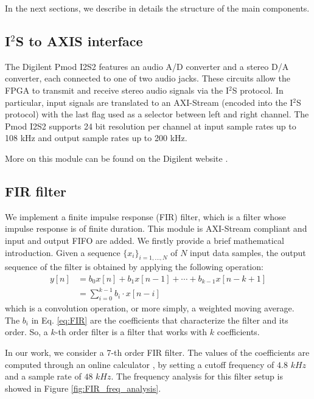 \documentclass[11pt, a4paper]{article}
\begin{document}
In the next sections, we describe in details the structure of the main components.

\subsection{I$^2$S to AXIS interface}
The Digilent Pmod I2S2 features an audio A/D converter and a stereo D/A converter, each connected to one of two audio jacks. These circuits allow the FPGA to transmit and receive stereo audio signals via the I$^2$S protocol. In particular, input signals are translated to an AXI-Stream (encoded into the I$^2$S protocol) with the last flag used as a selector between left and right channel. The Pmod I2S2 supports 24 bit resolution per channel at input sample rates up to 108 kHz and output sample rates up to 200 kHz.

More on this module can be found on the Digilent website \cite{Digilent}. 

\subsection{FIR filter}
We implement a finite impulse response (FIR) filter, which is a filter whose impulse response is of finite duration. This module is AXI-Stream compliant and input and output FIFO are added.
We firstly provide a brief mathematical introduction. Given a sequence $\{x_i\}_{i=1,\dots,N}$ of $N$ input data samples, the output sequence of the filter is obtained by applying the following operation:
\begin{equation}
    \begin{aligned}
        y[n] &=b_{0} x[n]+b_{1} x[n-1]+\cdots+b_{k-1} x[n-k+1] \\
        &=\sum_{i=0}^{k-1} b_{i} \cdot x[n-i]
    \end{aligned}
    \label{eq:FIR}
\end{equation}
which is a convolution operation, or more simply, a weighted moving average. The $b_i$ in Eq. \ref{eq:FIR} are the coefficients that characterize the filter and its order. So, a $k$-th order filter is a filter that works with $k$ coefficients.  

In our work, we consider a 7-th order FIR filter. The values of the coefficients are computed through an online calculator %
, by setting a cutoff frequency of $4.8$ $kHz$ and a sample rate of $48$ $kHz$. The frequency analysis for this filter setup is showed in Figure \ref{fig:FIR_freq_analysis}.
\end{document}
